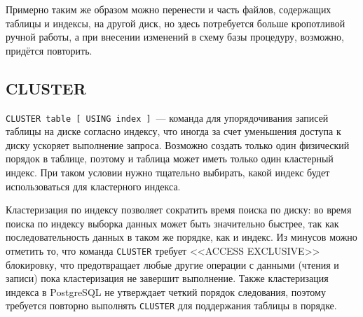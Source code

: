 Примерно таким же образом можно перенести и часть файлов, содержащих таблицы и индексы, на другой диск, но здесь потребуется больше кропотливой ручной работы, а при внесении изменений в схему базы процедуру, возможно, придётся повторить.


\subsection{CLUSTER}

\lstinline!CLUSTER table [ USING index ]!~--- команда для упорядочивания записей таблицы на диске согласно индексу, что иногда за счет уменьшения доступа к диску ускоряет выполнение запроса. Возможно создать только один физический порядок в таблице, поэтому и таблица может иметь только один кластерный индекс. При таком условии нужно тщательно выбирать, какой индекс будет использоваться для кластерного индекса.

Кластеризация по индексу позволяет сократить время поиска по диску: во время поиска по индексу выборка данных может быть значительно быстрее, так как последовательность данных в таком же порядке, как и индекс. Из минусов можно отметить то, что команда \lstinline!CLUSTER! требует <<ACCESS EXCLUSIVE>> блокировку, что предотвращает любые другие операции с данными (чтения и записи) пока кластеризация не завершит выполнение. Также кластеризация индекса в PostgreSQL не утверждает четкий порядок следования, поэтому требуется повторно выполнять \lstinline!CLUSTER! для поддержания таблицы в порядке.
